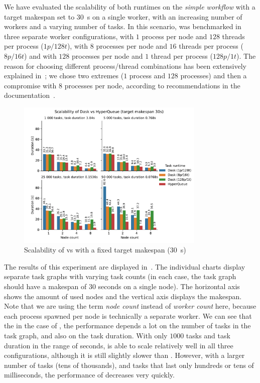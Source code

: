 We have evaluated the scalability of both runtimes on the \emph{simple workflow} with a target
makespan set to \SI{30}{\second} on a single worker, with an increasing number of workers
and a varying number of tasks. In this scenario, \dask{} was benchmarked in three
separate worker configurations, with $1$ process per node and
$128$ threads per process ($1p/128t$), with $8$
processes per node and $16$ threads per process ($8p/16t$) and
with $128$ processes per node and $1$ thread per process
($128p/1t$). The reason for choosing different process/thread combinations has been
extensively explained in~; we chose two extremes ($1$
process and $128$ processes) and then a compromise with $8$
processes per node, according to recommendations in the \dask{}
documentation~\cite{dask-thread-recommendation}.

\begin{figure}[h]
	\centering
	\includegraphics[width=0.8\textwidth]{imgs/hq/charts/dask-vs-hq-sleep}
	\caption{Scalability of \hyperqueue{} vs \dask{} with a fixed target makespan
	(\SI{30}{\second})}
	\label{fig:hq-dask-sleep}
\end{figure}

The results of this experiment are displayed in~. The individual charts
display separate task graphs with varying task counts (in each case, the task graph should have a
makespan of $30$ seconds on a single node). The horizontal axis shows the amount
of used nodes and the vertical axis displays the makespan. Note that we are using the term
\emph{node count} instead of \emph{worker count} here, because each
\dask{} process spawned per node is technically a separate worker. We can see that
the in the case of \dask{}, the performance depends a lot on the number of tasks in
the task graph, and also on the task duration. With only $1000$ tasks and task
duration in the range of seconds, \dask{} is able to scale relatively well in all
three configurations, although it is still slightly slower than \hyperqueue{}. However,
with a larger number of tasks (tens of thousands), and tasks that last only hundreds or tens of
milliseconds, the performance of \dask{} decreases very quickly.

